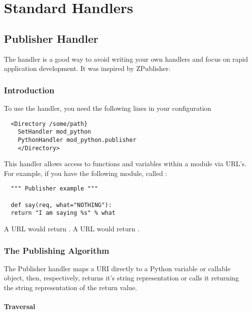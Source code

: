 \chapter{Standard Handlers\label{handlers}}

\section{Publisher Handler\label{hand-pub}}

The  handler is a good way to avoid writing your own
handlers and focus on rapid application development. It was inspired
by  ZPublisher.

\subsection{Introduction\label{hand-pub-intro}}

To use the handler, you need the following lines in your configuration
\begin{verbatim}
  <Directory /some/path}
    SetHandler mod_python 
    PythonHandler mod_python.publisher
    </Directory>
\end{verbatim}

This handler allows access to functions and variables within a module
via URL's. For example, if you have the following module, called 
:

\begin{verbatim}
  """ Publisher example """

  def say(req, what="NOTHING"):
  return "I am saying %s" % what

\end{verbatim}

A URL  would return 
. A URL 
 would
return .

\subsection{The Publishing Algorithm\label{hand-pub-alg}}

The Publisher handler maps a URI directly to a Python variable or
callable object, then, respectively, returns it's string
representation or calls it returning the string representation of the
return value.

\subsubsection{Traversal\label{hand-pub-alg-trav}}


